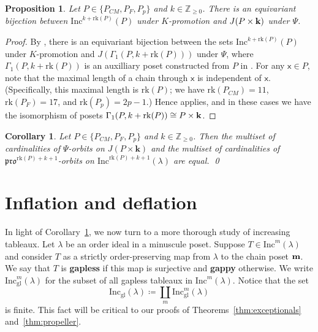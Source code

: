 \documentclass[12pt]{amsart}
\newcommand{\x}{\ensuremath{\mathsf{x}}}
\newtheorem{proposition}[theorem]{Proposition}
\newtheorem{corollary}[theorem]{Corollary}
\theoremstyle{definition}
\theoremstyle{remark}
\numberwithin{equation}{section}
\newcommand{\inc}{\ensuremath{\mathrm{Inc}}}
\newcommand{\incgl}{\inc_{\mathrm{gl}}}
\newcommand{\pro}{\mathfrak{pro}}
\newcommand{\rank}{\ensuremath{\mathrm{rk}}}
\newcommand{\mot}{\ensuremath{\mathsf{Mot}}}
\begin{document}
\begin{proposition}
Let $P \in \{ P_{CM}, P_F, P_p \}$ and $k \in \mathbb{Z}_{\geq 0}$.
There is an equivariant bijection between $\inc^{k+\rank(P)}(P)$ under $K$-promotion and $J(P \times {\bf k})$ under $\Psi$.
\end{proposition}
\begin{proof}
By \cite[Corollary~5.2]{Dilks.Striker.Vorland}, there is an equivariant bijection between the sets $\inc^{k+\rank(P)}(P)$ under $K$-promotion and $J(\Gamma_1(P,k+\rank(P)))$  under $\Psi$, where $\Gamma_1(P,k+\rank(P))$ is an auxilliary poset constructed from $P$ in \cite[]{Dilks.Striker.Vorland}.
For any $\x \in P$, note that the maximal length of a chain through $\x$ is independent of $\x$. (Specifically, this maximal length is $\rank(P)$; we have $\rank(P_{CM}) = 11$, $\rank(P_F)= 17$, and $\rank(P_p) = 2p-1$.)
Hence \cite[Corollary~3.28]{Dilks.Striker.Vorland} applies, and in these cases we have the isomorphism of posets $\Gamma_1(P,k+\rank(P)) \cong P \times {\bf k}$.
\end{proof}

\begin{corollary}\label{cor:multisets}
Let $P \in \{ P_{CM}, P_F, P_p \}$ and $k \in \mathbb{Z}_{\geq 0}$.
Then the multiset of cardinalities of $\Psi$-orbits on $J(P \times \mathbf{k})$ and the multiset of cardinalities of $\pro^{\rank(P)+ k+1}$-orbits on $\inc^{\rank(P)+ k+1}(\lambda)$ are equal. \qed
\end{corollary}

\section{Inflation and deflation}\label{sec:inflation}
In light of Corollary~\ref{cor:multisets}, we now turn to a more thorough study of increasing tableaux. Let $\lambda$ be an order ideal in a minuscule poset.
Suppose $T \in \inc^m(\lambda)$ and consider $T$ as a strictly order-preserving map from $\lambda$ to the chain poset ${\bf m}$. We say that $T$ is {\bf gapless} if this map is surjective and {\bf gappy} otherwise. We write $\incgl^m(\lambda)$ for the subset of all gapless tableaux in $\inc^m(\lambda)$. Notice that the set 
\[
\incgl(\lambda) \coloneqq \coprod_{m} \incgl^m(\lambda)
\]
is finite. This fact will be critical to our proofs of Theorems~\ref{thm:exceptionals} and~\ref{thm:propeller}.
\end{document}
